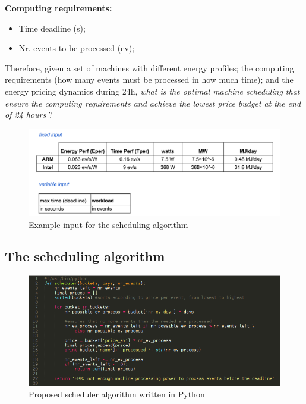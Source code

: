 \vspace{5mm}

\textbf{Computing requirements:}
\begin{itemize}
  \item[] Time deadline (s);
  \item[] Nr. events to be processed (ev);
\end{itemize}

\vspace{10mm}

Therefore, given a set of machines with different energy profiles; the computing requirements (how many events must be processed in how much time); and the energy pricing dynamics during 24h, \textit{what is the optimal machine scheduling that ensure the computing requirements and achieve the lowest price budget at the end of 24 hours} ?

\begin{figure}[h]
  \centering
    \includegraphics[width=150mm]{"img/input"}
    \caption{Example input for the scheduling algorithm}
    \label{fig:input}
\end{figure}


\subsection*{The scheduling algorithm}

\begin{figure}[h]
  \centering
    \includegraphics[width=150mm]{"img/scheduler_code"}
    \caption{Proposed scheduler algorithm written in Python}
    \label{fig:scheduler_code}
\end{figure}


